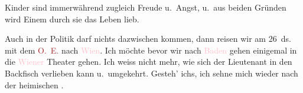 \pstart
           Kinder sind immerwährend zugleich Freude u. Angst, u. aus beiden Gründen wird Einem
               durch sie das Leben lieb.\pend
           
\pstart
           Auch in der Politik darf nichts dazwischen kommen, dann reisen wir am
                  26 ds. mit dem \textcolor{brown}{O. E.}\ledrightnote{\textcolor{brown}{Orient Express}} nach \textcolor{pink}{Wien}\ledrightnote{\textcolor{pink}{Wien}}. Ich möchte bevor wir nach \textcolor{pink}{Baden}\ledrightnote{\textcolor{pink}{Baden bei Wien}} gehen einigemal in die \textcolor{pink}{Wiener}\ledrightnote{\textcolor{pink}{Wien}} Theater gehen. Ich weiss nicht mehr, wie sich der Lieutenant in den
               Backfisch verlieben kann u. umgekehrt. Gesteh’ ichs, ich sehne mich wieder nach der
               heimischen \label{K_L03830-2v}\label{K_L03830-2}.\pend
           
